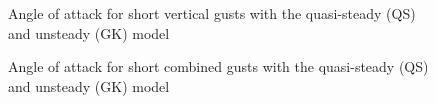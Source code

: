 \begin{figure}[h]
  \centering
  \caption{Angle of attack for short vertical gusts with the quasi-steady (QS) and unsteady (GK) model}
  \label{fig:alpha_vs_Tg_wt1}
\end{figure}

\begin{figure}[h]
  \centering
  \caption{Angle of attack for short combined gusts with the quasi-steady (QS) and unsteady (GK) model}
  \label{fig:alpha_vs_Tg_wt3}
\end{figure}

